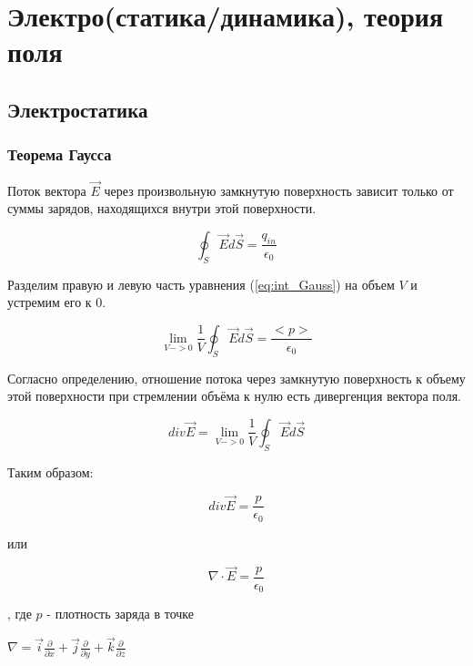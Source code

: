 \section{Электро(статика/динамика), теория поля}
	\subsection{Электростатика}
		\subsubsection{Теорема Гаусса}
		
		Поток вектора $\overrightarrow{E}$ через произвольную замкнутую поверхность зависит только от суммы зарядов, находящихся внутри этой поверхности.
		
\begin{equation} \label{eq:int_Gauss}
\oint_{S} \overrightarrow{E} d \overrightarrow{S} = \frac{q_{in}}{\epsilon_{0}}
\end{equation}

Разделим правую и левую часть уравнения (\ref{eq:int_Gauss}) на объем $V$ и устремим его к 0.

\begin{equation}
\lim_{V -> 0} \frac{1}{V} \oint_{S} \overrightarrow{E} d \overrightarrow{S} = \frac{<p>}{\epsilon_0}
\end{equation}

Согласно определению, отношение потока через замкнутую поверхность к объему этой поверхности при стремлении объёма к нулю есть дивергенция вектора поля.

\begin{equation}
div \overrightarrow{E} =  \lim_{V -> 0} \frac{1}{V} \oint_{S} \overrightarrow{E} d \overrightarrow{S}
\end{equation}

Таким образом:

\begin{equation}
div \overrightarrow{E} = \frac{p}{\epsilon_0}
\end{equation}

или

\begin{equation} \label{eq:dif_Gauss}
\nabla \cdot  \overrightarrow{E} = \frac{p}{\epsilon_0}
\end{equation}

, где $p$ - плотность заряда в точке

$\nabla =  \overrightarrow{i} \frac{\partial}{\partial x} + \overrightarrow{j} \frac{\partial}{\partial y} + \overrightarrow{k} \frac{\partial}{\partial z}$

